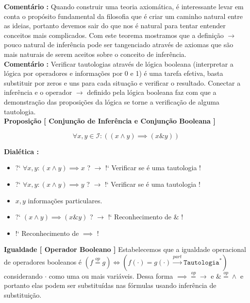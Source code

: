 \documentclass[10pt,a4paper]{report}
\begin{document}
\textbf{Comentário :} Quando construir uma teoria axiomática, é interessante levar em conta o propósito fundamental da filosofia que é criar um caminho natural entre as ideias, portanto devemos sair do que nos é natural para tentar entender conceitos mais complicados. Com este teorema mostramos que a definição $\rightarrow$ pouco natural de inferência pode ser tangenciado através de axiomas que são mais naturais de serem aceitos sobre o conceito de inferência.\\

\textbf{Comentário :} Verificar tautologias através de lógica booleana (interpretar a lógica por operadores e informações por 0 e 1) é uma tarefa efetiva, basta substituir por zeros e uns para cada situação e verificar o resultado. Conectar a inferência e o operador $\rightarrow$ definido pela lógica booleana faz com que a demonstração das proposições da lógica se torne a verificação de alguma tautologia.\\



\textbf{Proposição [ Conjunção de Inferência e Conjunção Booleana ]}

$$ \forall x, y \in \mathcal{I} : ( (x \wedge y) \implies (x \& y) )$$

\textbf{Dialética :} 

\begin{itemize}
	\item[ ] ?` $ \forall x,y : (x \wedge y) \implies x $  ? $\rightarrow$ !` Verificar se é uma tautologia !
	\item[ ] ?` $ \forall x,y : (x \wedge y) \implies y $ ? $\rightarrow$ !` Verificar se é uma tautologia !
	\item[ ] $ x,y $ informações particulares.
	\item[ ] ?` $ (x \wedge y) \implies (x \& y) $ ? $\rightarrow$ !` Reconhecimento de $\&$ !
	\item[ ] !` Reconhecimento de $\implies$ !
\end{itemize}

\hspace{\baselineskip}

\textbf{Igualdade [ Operador Booleano ]} Estabelecemos que a igualdade operacional de operadores booleanos é $ ( f \overset{op}{=} g ) \iff ( f(\cdot) = g(\cdot) \overset{part}{\rightarrow} \texttt{Tautologia}^* ) $ considerando $\cdot$ como uma ou mais variáveis. Dessa forma $ \implies \overset{op}{=} \rightarrow $ e $ \& \overset{op}{=} \wedge $ e portanto elas podem ser substituídas nas fórmulas usando inferência de substituição.
\end{document}

